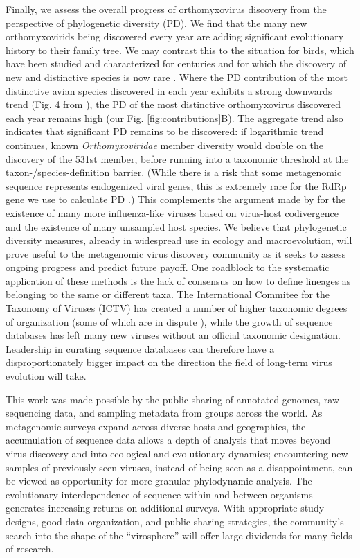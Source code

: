 \documentclass[11pt,twocolumn]{article}
\begin{document}
Finally, we assess the overall progress of orthomyxovirus discovery from the perspective of phylogenetic diversity (PD). We find that the many new orthomyxovirids being discovered every year are adding significant evolutionary history to their family tree. We may contrast this to the situation for birds, which have been studied and characterized for centuries and for which the discovery of new and distinctive species is now rare \citep{lum_tracking_2022}. Where the PD contribution of the most distinctive avian species discovered in each year exhibits a strong downwards trend (Fig. 4 from \cite{lum_tracking_2022}), the PD of the most distinctive orthomyxovirus discovered each year remains high (our Fig. \ref{fig:contributions}B). The aggregate trend also indicates that significant PD remains to be discovered: if logarithmic trend continues, known \textit{Orthomyxoviridae} member diversity would double on the discovery of the 531st member, before running into a taxonomic threshold at the taxon-/species-definition barrier. (While there is a risk that some metagenomic sequence represents endogenized viral genes, this is extremely rare for the RdRp gene we use to calculate PD \citep{whitfield_diversity_2017}.)
This complements the argument made by \cite{parry_divergent_2020} for the existence of many more influenza-like viruses based on virus-host codivergence and the existence of many unsampled host species.
We believe that phylogenetic diversity measures, already in widespread use in ecology and macroevolution, will prove useful to the metagenomic virus discovery community as it seeks to assess ongoing progress and predict future payoff.
One roadblock to the systematic application of these methods is the lack of consensus on how to define lineages as belonging to the same or different taxa. 
The International Commitee for the Taxonomy of Viruses (ICTV) has created a number of higher taxonomic degrees of organization (some of which are in dispute \citep{holmes_can_2019}), while the growth of sequence databases has left many new viruses without an official taxonomic designation.
Leadership in curating sequence databases can therefore have a disproportionately bigger impact on the direction the field of long-term virus evolution will take.


This work was made possible by the public sharing of annotated genomes, raw sequencing data, and sampling metadata from groups across the world. As metagenomic surveys expand across diverse hosts and geographies, the accumulation of sequence data allows a depth of analysis that moves beyond virus discovery and into ecological and evolutionary dynamics; encountering new samples of previously seen viruses, instead of being seen as a disappointment, can be viewed as opportunity for more granular phylodynamic analysis. The evolutionary interdependence of sequence within and between organisms generates increasing returns on additional surveys. With appropriate study designs, good data organization, and public sharing strategies, the community's search into the shape of the ``virosphere'' will offer large dividends for many fields of research.
\end{document}

